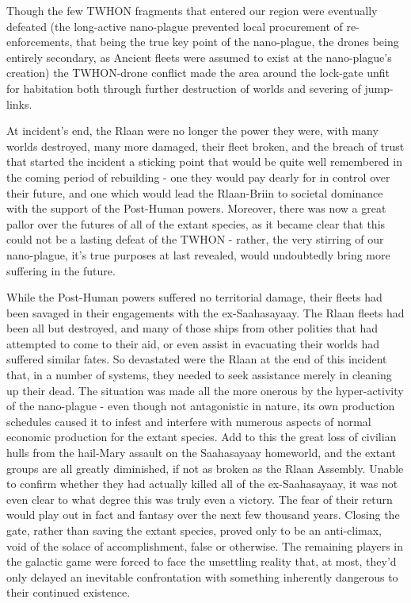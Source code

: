 Though the few TWHON fragments that entered our region were eventually
defeated (the long-active nano-plague prevented local procurement of
re-enforcements, that being the true key point of the nano-plague, the
drones being entirely secondary, as Ancient fleets were assumed to
exist at the nano-plague's creation) the TWHON-drone conflict made the
area around the lock-gate unfit for habitation both through further
destruction of worlds and severing of jump-links.

At incident's end, the Rlaan were no longer the power they were, with
many worlds destroyed, many more damaged, their fleet broken, and the
breach of trust that started the incident a sticking point that would
be quite well remembered in the coming period of rebuilding - one they
would pay dearly for in control over their future, and one which would
lead the Rlaan-Briin to societal dominance with the support of the
Post-Human powers. Moreover, there was now a great pallor over the
futures of all of the extant species, as it became clear that this
could not be a lasting defeat of the TWHON - rather, the very stirring
of our nano-plague, it's true purposes at last revealed, would
undoubtedly bring more suffering in the future.

While the Post-Human powers suffered no territorial damage, their
fleets had been savaged in their engagements with the
ex-Saahasayaay. The Rlaan fleets had been all but destroyed, and many
of those ships from other polities that had attempted to come to their
aid, or even assist in evacuating their worlds had suffered similar
fates. So devastated were the Rlaan at the end of this incident that,
in a number of systems, they needed to seek assistance merely in
cleaning up their dead. The situation was made all the more onerous by
the hyper-activity of the nano-plague - even though not antagonistic in
nature, its own production schedules caused it to infest and interfere
with numerous aspects of normal economic production for the extant
species. Add to this the great loss of civilian hulls from the
hail-Mary assault on the Saahasayaay homeworld, and the extant groups
are all greatly diminished, if not as broken as the Rlaan
Assembly. Unable to confirm whether they had actually killed all of
the ex-Saahasayaay, it was not even clear to what degree this was
truly even a victory. The fear of their return would play out in fact
and fantasy over the next few thousand years. Closing the gate, rather
than saving the extant species, proved only to be an anti-climax, void
of the solace of accomplishment, false or otherwise. The remaining
players in the galactic game were forced to face the unsettling
reality that, at most, they'd only delayed an inevitable confrontation
with something inherently dangerous to their continued existence.

